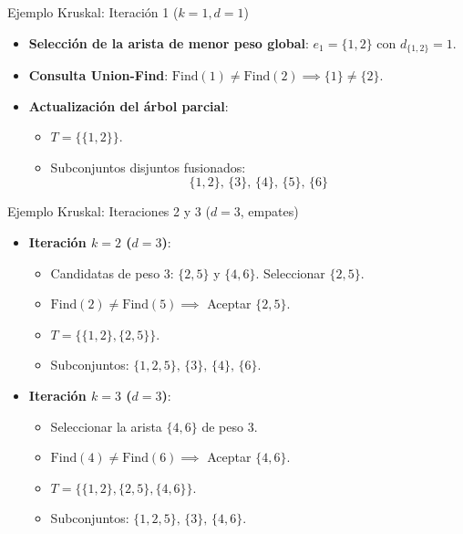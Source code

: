 \documentclass[
  ignorenonframetext,
]{beamer}
\providecommand{\tightlist}{%
  \setlength{\itemsep}{0pt}\setlength{\parskip}{0pt}}
\begin{document}
\begin{frame}{Ejemplo Kruskal: Iteración 1 (\(k=1, d=1\))}
\label{ejemplo-kruskal-iteraciuxf3n-1-k1-d1}
\begin{itemize}
\item
  \textbf{Selección de la arista de menor peso global}:
  \(e_1 = \{1, 2\}\) con \(d_{\{1,2\}} = 1\).
\item
  \textbf{Consulta Union-Find}:
  \(\text{Find}(1) \neq \text{Find}(2) \implies \{1\} \neq \{2\}\).
\item
  \textbf{Actualización del árbol parcial}:

  \begin{itemize}
  \tightlist
  \item
    \(T = \{\{1, 2\}\}\).
  \item
    Subconjuntos disjuntos fusionados: \[
    \{1, 2\}, \, \{3\}, \, \{4\}, \, \{5\}, \, \{6\}
    \]
  \end{itemize}
\end{itemize}
\end{frame}

\begin{frame}{Ejemplo Kruskal: Iteraciones 2 y 3 (\(d=3\), empates)}
\label{ejemplo-kruskal-iteraciones-2-y-3-d3-empates}
\begin{itemize}
\tightlist
\item
  \textbf{Iteración \(k=2\) (\(d=3\))}:

  \begin{itemize}
  \tightlist
  \item
    Candidatas de peso 3: \(\{2, 5\}\) y \(\{4, 6\}\). Seleccionar
    \(\{2, 5\}\).
  \item
    \(\text{Find}(2) \neq \text{Find}(5) \implies\) Aceptar
    \(\{2, 5\}\).
  \item
    \(T = \{\{1, 2\}, \{2, 5\}\}\).
  \item
    Subconjuntos: \(\{1, 2, 5\}, \, \{3\}, \, \{4\}, \, \{6\}\).
  \end{itemize}
\item
  \textbf{Iteración \(k=3\) (\(d=3\))}:

  \begin{itemize}
  \tightlist
  \item
    Seleccionar la arista \(\{4, 6\}\) de peso 3.
  \item
    \(\text{Find}(4) \neq \text{Find}(6) \implies\) Aceptar
    \(\{4, 6\}\).
  \item
    \(T = \{\{1, 2\}, \{2, 5\}, \{4, 6\}\}\).
  \item
    Subconjuntos: \(\{1, 2, 5\}, \, \{3\}, \, \{4, 6\}\).
  \end{itemize}
\end{itemize}
\end{frame}
\end{document}
